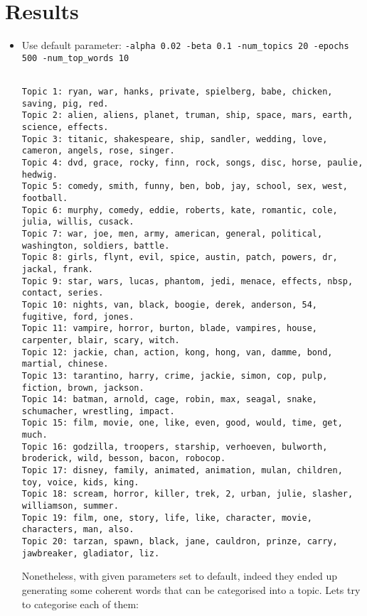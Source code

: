 \documentclass{article}[a4paper]
\begin{document}
\section{Results}
\begin{itemize}
    \item Use default parameter: \texttt{-alpha 0.02 -beta 0.1 -num\_topics 20 -epochs 500 -num\_top\_words 10} \\
    
    \begin{Verbatim}[fontsize=\small]
    
Topic 1: ryan, war, hanks, private, spielberg, babe, chicken, saving, pig, red. 
Topic 2: alien, aliens, planet, truman, ship, space, mars, earth, science, effects. 
Topic 3: titanic, shakespeare, ship, sandler, wedding, love, cameron, angels, rose, singer. 
Topic 4: dvd, grace, rocky, finn, rock, songs, disc, horse, paulie, hedwig. 
Topic 5: comedy, smith, funny, ben, bob, jay, school, sex, west, football. 
Topic 6: murphy, comedy, eddie, roberts, kate, romantic, cole, julia, willis, cusack. 
Topic 7: war, joe, men, army, american, general, political, washington, soldiers, battle. 
Topic 8: girls, flynt, evil, spice, austin, patch, powers, dr, jackal, frank. 
Topic 9: star, wars, lucas, phantom, jedi, menace, effects, nbsp, contact, series. 
Topic 10: nights, van, black, boogie, derek, anderson, 54, fugitive, ford, jones. 
Topic 11: vampire, horror, burton, blade, vampires, house, carpenter, blair, scary, witch. 
Topic 12: jackie, chan, action, kong, hong, van, damme, bond, martial, chinese. 
Topic 13: tarantino, harry, crime, jackie, simon, cop, pulp, fiction, brown, jackson. 
Topic 14: batman, arnold, cage, robin, max, seagal, snake, schumacher, wrestling, impact. 
Topic 15: film, movie, one, like, even, good, would, time, get, much. 
Topic 16: godzilla, troopers, starship, verhoeven, bulworth, broderick, wild, besson, bacon, robocop. 
Topic 17: disney, family, animated, animation, mulan, children, toy, voice, kids, king. 
Topic 18: scream, horror, killer, trek, 2, urban, julie, slasher, williamson, summer. 
Topic 19: film, one, story, life, like, character, movie, characters, man, also. 
Topic 20: tarzan, spawn, black, jane, cauldron, prinze, carry, jawbreaker, gladiator, liz.
    \end{Verbatim}
    Nonetheless, with given parameters set to default, indeed they ended up generating some coherent words that can be categorised into a topic. Lets try to categorise each of them:

\end{itemize}
\end{document}
